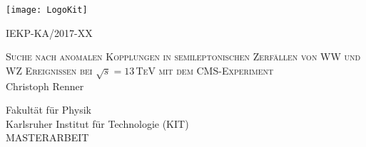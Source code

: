 \begin{titlepage}
  \begin{addmargin}[0cm]{0cm}
    \thispagestyle{empty}
    \vspace{-1cm}
    \begin{center}

	\end{center}
  		\begin{minipage}{0.5\textwidth}
  			\texttt{[image: LogoKit]}
  		\end{minipage}%
  		\begin{minipage}{0.5\textwidth}
  			\hspace{3.5cm}IEKP-KA/2017-XX
  		\end{minipage}

	\vspace{2cm}
	\begin{center}
\vspace{0.8cm}

  \Large{\textsc{Suche nach anomalen Kopplungen in semileptonischen Zerf\"allen von WW und WZ Ereignissen bei $\sqrt{s}=13$\,TeV mit dem CMS-Experiment}}\\

\vspace{0.9cm}
\Large{Christoph Renner}\\
\vspace{0.9cm}
\vspace{1cm}
\large{Fakult\"at f\"ur Physik\\
  
  Karlsruher Institut f\"ur Technologie (KIT)\\
  \vspace{0.825 cm}
  \large{MASTERARBEIT}\\
  \vspace{0.825 cm}

}
\end{center}
\end{addmargin}
\end{titlepage}
